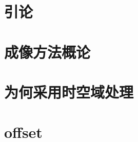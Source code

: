 %
%




\pagestyle{empty}

\frontmatter

%


\tableofcontents
\cleardoublepage
{}
\listoffigures
\cleardoublepage
{}
\listoftables

\mainmatter
\pagestyle{body}


\chapter*{引论}



\chapter{成像方法概论}








\chapter{为何采用时空域处理}
\label{chap:why-time-space}






\chapter{offset}
\label{chap:offset}

\appendix



